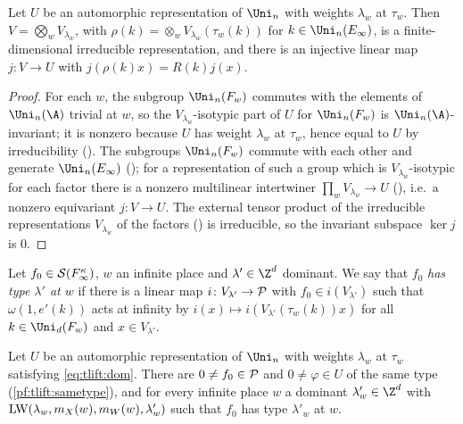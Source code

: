 \begin{lemma}\label{pf:tlift:formex}
Let $U$ be an automorphic representation of $\Uni_n$ with weights $\lambda_w$ at $\tau_w$. Then
$V=\bigotimes_wV_{\lambda_w}$, with $\rho(k)=\otimes_wV_{\lambda_w}(\tau_w(k))$ for $k\in\Uni_n(E_\infty)$, is a finite-dimensional
irreducible representation, and there is an injective linear map $j\colon V\to U$ with $j(\rho(k)x)=R(k)j(x)$.
\end{lemma}

\begin{proof}
For each $w$, the subgroup $\Uni_n(F_w)$ commutes with the elements of $\Uni_n(\A)$ trivial at $w$, so the
$V_{\lambda_w}$-isotypic part of $U$ for $\Uni_n(F_w)$ is $\Uni_n(\A)$-invariant; it is nonzero because $U$ has weight
$\lambda_w$ at $\tau_w$, hence equal to $U$ by irreducibility ().
The subgroups $\Uni_n(F_w)$ commute with each other and generate $\Uni_n(E_\infty)$
(); for a representation of such a group which is
$V_{\lambda_w}$-isotypic for each factor there is a nonzero multilinear intertwiner $\prod_wV_{\lambda_w}\to U$
(), i.e.\ a nonzero equivariant
$j\colon V\to U$. The external tensor product of the irreducible representations $V_{\lambda_w}$ of the factors
() is irreducible, so the invariant subspace $\ker j$ is $0$.
\end{proof}

\begin{definition}\label{pf:tlift:hastype}
Let $f_0\in\mathcal{S}(F_\infty^\kappa)$, $w$ an infinite place and $\lambda'\in\Z^d$ dominant. We say that $f_0$ \emph{has type
$\lambda'$ at $w$} if there is a linear map $i\colon V_{\lambda'}\to\mathcal{P}$ with $f_0\in i(V_{\lambda'})$ such that $\omega(1,e'(k))$ acts at
infinity by $i(x)\mapsto i(V_{\lambda'}(\tau_w(k))x)$ for all $k\in\Uni_d(F_w)$ and $x\in V_{\lambda'}$.
\end{definition}

\begin{proposition}\label{pf:tlift:realpair}
Let $U$ be an automorphic representation of $\Uni_n$ with weights $\lambda_w$ at $\tau_w$ satisfying
\eqref{eq:tlift:dom}. There are $0\ne f_0\in\mathcal{P}$ and $0\ne\varphi\in U$ of the same type
(\cref{pf:tlift:sametype}), and for every infinite place $w$ a dominant $\lambda'_w\in\Z^d$ with
$\mathrm{LW}(\lambda_w,m_X(w),m_W(w),\lambda'_w)$ such that $f_0$ has type $\lambda'_w$ at $w$.
\end{proposition}

